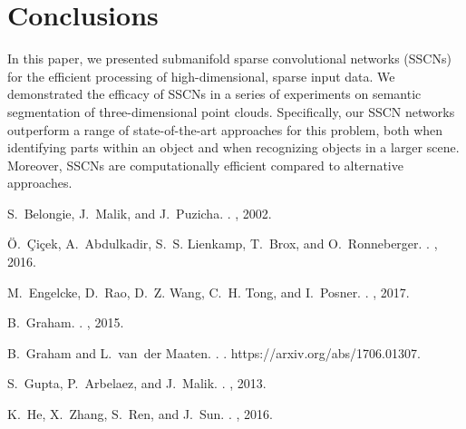 \documentclass[10pt,twocolumn,letterpaper]{article}
\begin{document}
 \section{Conclusions}
In this paper, we presented submanifold sparse convolutional networks (SSCNs) for the efficient processing of high-dimensional, sparse input data. We demonstrated the efficacy of SSCNs in a series of experiments on semantic segmentation of three-dimensional point clouds. Specifically, our SSCN networks outperform a range of state-of-the-art approaches for this problem, both when identifying parts within an object and when recognizing objects in a larger scene. Moreover, SSCNs are computationally efficient compared to alternative approaches.
 

\small{
\begin{thebibliography}{10}\itemsep=-1pt

S.~Belongie, J.~Malik, and J.~Puzicha.
.
,
  2002.

{\"O}.~{\c{C}}i{\c{c}}ek, A.~Abdulkadir, S.~S. Lienkamp, T.~Brox, and
  O.~Ronneberger.
.
, 2016.

M.~Engelcke, D.~Rao, D.~Z. Wang, C.~H. Tong, and I.~Posner.
.
, 2017.

B.~Graham.
.
, 2015.

B.~Graham and L.~van~der Maaten.
.
.
\newblock https://arxiv.org/abs/1706.01307.

S.~Gupta, P.~Arbelaez, and J.~Malik.
.
, 2013.

K.~He, X.~Zhang, S.~Ren, and J.~Sun.
.
, 2016.


\end{thebibliography}}
\end{document}
